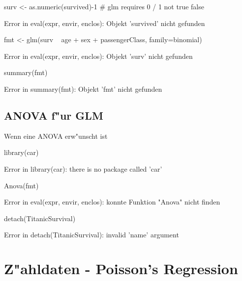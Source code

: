 \documentclass[a4paper,twoside]{tufte-book}\usepackage[]{graphicx}\usepackage[]{color}
\begin{document}
\begin{appendices}
\begin{Schunk}
\begin{Sinput}
surv <- as.numeric(survived)-1 # glm requires 0 / 1 not true false
\end{Sinput}
\begin{Soutput}
Error in eval(expr, envir, enclos): Objekt 'survived' nicht gefunden
\end{Soutput}
\begin{Sinput}
fmt <- glm(surv ~ age  + sex + passengerClass, family=binomial)
\end{Sinput}
\begin{Soutput}
Error in eval(expr, envir, enclos): Objekt 'surv' nicht gefunden
\end{Soutput}
\begin{Sinput}
summary(fmt)
\end{Sinput}
\begin{Soutput}
Error in summary(fmt): Objekt 'fmt' nicht gefunden
\end{Soutput}
\end{Schunk}

\subsection{ANOVA f"ur GLM}

Wenn eine ANOVA erw"unscht ist

\begin{Schunk}
\begin{Sinput}
library(car)
\end{Sinput}
\begin{Soutput}
Error in library(car): there is no package called 'car'
\end{Soutput}
\begin{Sinput}
Anova(fmt)
\end{Sinput}
\begin{Soutput}
Error in eval(expr, envir, enclos): konnte Funktion "Anova" nicht finden
\end{Soutput}
\begin{Sinput}
detach(TitanicSurvival)
\end{Sinput}
\begin{Soutput}
Error in detach(TitanicSurvival): invalid 'name' argument
\end{Soutput}
\end{Schunk}

\section{Z"ahldaten - Poisson's Regression}


\end{appendices}
\end{document}
